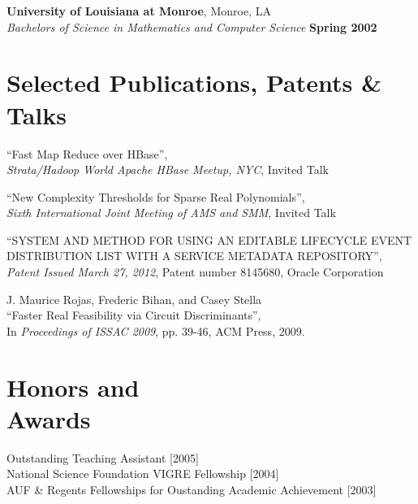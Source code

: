 \documentclass[margin,line,12pt]{resume}
\begin{document}
\begin{resume}
    \textbf{University of Louisiana at Monroe}, Monroe, LA \vspace{2mm}\\\vspace{1mm}%
    \textsl{Bachelors of Science in Mathematics and Computer Science} \hfill \textbf{ Spring 2002}\vspace{-3mm}\\\vspace{-1mm}%

    \section{\mysidestyle Selected Publications, Patents \& Talks}
    
    ``Fast Map Reduce over HBase'',\\
    \textsl{Strata/Hadoop World Apache HBase Meetup, NYC}, Invited Talk

    ``New Complexity Thresholds for Sparse Real Polynomials'',\\
    \textsl{Sixth International Joint Meeting of AMS and SMM}, Invited Talk

    ``SYSTEM AND METHOD FOR USING AN EDITABLE LIFECYCLE EVENT DISTRIBUTION LIST WITH A SERVICE METADATA REPOSITORY'',\\
    \textsl{Patent Issued March 27, 2012}, Patent number 8145680, Oracle Corporation

    J. Maurice Rojas, Frederic Bihan, and Casey Stella\\
    ``Faster Real Feasibility via Circuit Discriminants'',\\
    In \textsl{Proceedings of ISSAC 2009}, pp. 39-46, ACM Press, 2009.

    
    
    \section{\mysidestyle Honors and\\Awards} 

    Outstanding Teaching Assistant [2005]                                                           \vspace{1mm}\\
    National Science Foundation VIGRE Fellowship [2004]                                             \vspace{1mm}\\
    AUF \& Regents Fellowships for Oustanding Academic Achievement [2003]                           


\end{resume}
\end{document}
